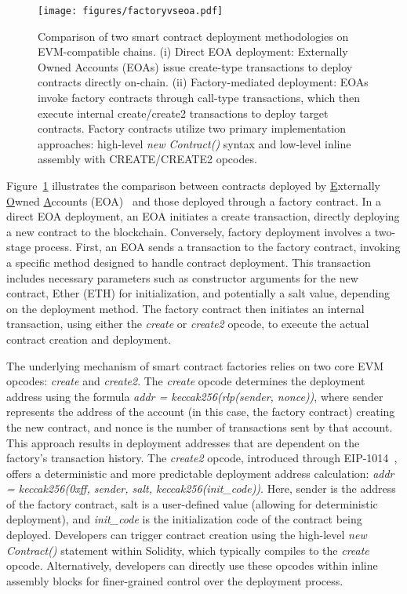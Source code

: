 \documentclass[acmsmall, screen]{acmart}
\begin{document}

	\begin{figure}[h]
		\centering
		\texttt{[image: figures/factoryvseoa.pdf]}
		\caption{Comparison of two smart contract deployment methodologies on EVM-compatible chains.
			(i) Direct EOA deployment: Externally Owned Accounts (EOAs) issue create-type transactions
			to deploy contracts directly on-chain. (ii) Factory-mediated deployment: EOAs invoke factory
			contracts through call-type transactions, which then execute internal create/create2 transactions
			to deploy target contracts. Factory contracts utilize two primary implementation approaches:
			high-level \textit{new Contract()} syntax and low-level inline assembly with CREATE/CREATE2
			opcodes.}
		\label{fig:deployment}
	\end{figure}

	Figure~\ref{fig:deployment} illustrates the comparison between contracts deployed by \underline{E}xternally
	\underline{O}wned \underline{A}ccounts (EOA)~\cite{ETHAccount} and those deployed through a factory
	contract. In a direct EOA deployment, an EOA initiates a create transaction, directly deploying
	a new contract to the blockchain. Conversely, factory deployment involves a two-stage process. First,
	an EOA sends a transaction to the factory contract, invoking a specific method designed to handle
	contract deployment. This transaction includes necessary parameters such as constructor
	arguments for the new contract, Ether (ETH) for initialization, and potentially a salt value, depending
	on the deployment method. The factory contract then initiates an internal transaction, using either
	the \textit{create} or \textit{create2} opcode, to execute the actual contract creation and
	deployment.

	The underlying mechanism of smart contract factories relies on two core EVM opcodes: \textit{create}
	and \textit{create2}. The \textit{create} opcode determines the deployment address using the formula
	\textit{addr = keccak256(rlp(sender, nonce))}, where sender represents the address of the account
	(in this case, the factory contract) creating the new contract, and nonce is the number of transactions
	sent by that account. This approach results in deployment addresses that are dependent on the
	factory's transaction history. The \textit{create2} opcode, introduced through EIP-1014~\cite{eip-1014},
	offers a deterministic and more predictable deployment address calculation: \textit{addr =
		keccak256(0xff, sender, salt, keccak256(init\_code))}. Here, sender is the address of the
	factory contract, salt is a user-defined value (allowing for deterministic deployment), and
	\textit{init\_code} is the initialization code of the contract being deployed. Developers can
	trigger contract creation using the high-level \textit{new Contract()} statement within Solidity,
	which typically compiles to the \textit{create} opcode. Alternatively, developers can directly use
	these opcodes within inline assembly blocks for finer-grained control over the deployment process.
\end{document}
